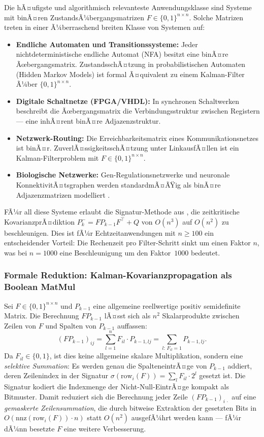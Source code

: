 ﻿\documentclass[a4paper,12pt]{article}
\theoremstyle{definition}
\begin{document}
Die hÃ¤ufigste und algorithmisch relevanteste Anwendungsklasse sind Systeme mit
binÃ¤ren ZustandsÃ¼bergangsmatrizen $F \in \{0,1\}^{n\times n}$. Solche Matrizen
treten in einer Ã¼berraschend breiten Klasse von Systemen auf:
\begin{itemize}
    \item \textbf{Endliche Automaten und Transitionssysteme:} Jeder nichtdeterministische
          endliche Automat (NFA) besitzt eine binÃ¤re Ãœbergangsmatrix. ZustandsschÃ¤tzung
          in probabilistischen Automaten (Hidden Markov Models) ist formal Ã¤quivalent
          zu einem Kalman-Filter Ã¼ber $\{0,1\}^{n\times n}$.
    \item \textbf{Digitale Schaltnetze (FPGA/VHDL):} In synchronen Schaltwerken
          beschreibt die Ãœbergangsmatrix die Verbindungsstruktur zwischen Registern ---
          eine inhÃ¤rent binÃ¤re Adjazenzstruktur.
    \item \textbf{Netzwerk-Routing:} Die Erreichbarkeitsmatrix eines Kommunikationsnetzes
          ist binÃ¤r. ZuverlÃ¤ssigkeitsschÃ¤tzung unter LinkausfÃ¤llen ist ein
          Kalman-Filterproblem mit $F \in \{0,1\}^{n\times n}$.
    \item \textbf{Biologische Netzwerke:} Gen-Regulationsnetzwerke und neuronale
          KonnektivitÃ¤tsgraphen werden standardmÃ¤ÃŸig als binÃ¤re Adjazenzmatrizen
          modelliert \cite{epp2026bio}.
\end{itemize}

FÃ¼r all diese Systeme erlaubt die Signatur-Methode aus \cite{epp2026boolmm}, die
zeitkritische KovarianzprÃ¤diktion $P_k^- = F P_{k-1} F^\top + Q$ von $O(n^3)$
auf $O(n^2)$ zu beschleunigen. Dies ist fÃ¼r Echtzeitanwendungen mit $n \geq 100$
ein entscheidender Vorteil: Die Rechenzeit pro Filter-Schritt sinkt um einen Faktor $n$,
was bei $n = 1000$ eine Beschleunigung um den Faktor~$1000$ bedeutet.

\subsubsection{Formale Reduktion: Kalman-Kovarianzpropagation als Boolean MatMul}

Sei $F \in \{0,1\}^{n\times n}$ und $P_{k-1}$ eine allgemeine reellwertige
positiv semidefinite Matrix. Die Berechnung $F P_{k-1}$ lÃ¤sst sich als $n^2$
Skalarprodukte zwischen Zeilen von $F$ und Spalten von $P_{k-1}$ auffassen:
\[
    (F P_{k-1})_{ij} = \sum_{l=1}^n F_{il} \cdot P_{k-1,lj}
    = \sum_{l:\, F_{il}=1} P_{k-1,lj}.
\]
Da $F_{il} \in \{0,1\}$, ist dies keine allgemeine skalare Multiplikation, sondern
eine \emph{selektive Summation}: Es werden genau die SpalteneintrÃ¤ge von $P_{k-1}$
addiert, deren Zeilenindex in der Signatur $\sigma(\text{row}_i(F)) = \sum_l F_{il}\cdot 2^l$
gesetzt ist. Die Signatur kodiert die Indexmenge der Nicht-Null-EintrÃ¤ge kompakt
als Bitmuster. Damit reduziert sich die Berechnung jeder Zeile $(FP_{k-1})_{i\,\cdot}$
auf eine \emph{gemaskerte Zeilensummation}, die durch bitweise Extraktion der
gesetzten Bits in $O(\text{nnz}(\text{row}_i(F)) \cdot n)$ statt $O(n^2)$ ausgefÃ¼hrt
werden kann --- fÃ¼r dÃ¼nn besetzte $F$ eine weitere Verbesserung.
\end{document}
